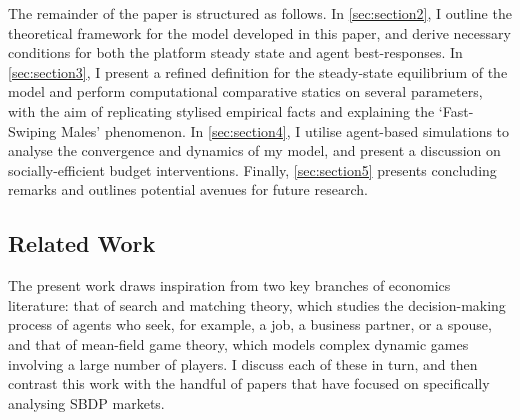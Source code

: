 The remainder of the paper is structured as follows. In \autoref{sec:section2}, I outline the theoretical framework for the model developed in this paper, and derive necessary conditions for both the platform steady state and agent best-responses. In \autoref{sec:section3}, I present a refined definition for the steady-state equilibrium of the model and perform computational comparative statics on several parameters, with the aim of replicating stylised empirical facts and explaining the `Fast-Swiping Males' phenomenon. In \autoref{sec:section4}, I utilise agent-based simulations to analyse the convergence and dynamics of my model, and present a discussion on socially-efficient budget interventions. Finally, \autoref{sec:section5} presents concluding remarks and outlines potential avenues for future research.

\subsection{Related Work}
\label{sec:section1.1}
The present work draws inspiration from two key branches of economics literature: that of search and matching theory, which studies the decision-making process of agents who seek, for example, a job, a business partner, or a spouse, and that of mean-field game theory, which models complex dynamic games involving a large number of players. 
I discuss each of these in turn, and then contrast this work with the handful of papers that have focused on specifically analysing SBDP markets.

